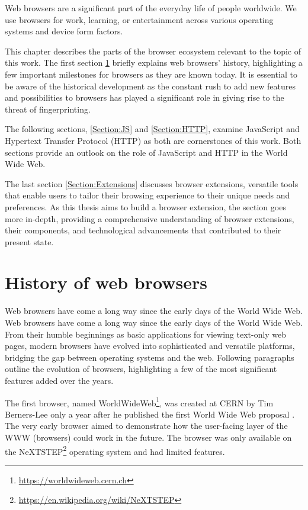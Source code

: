 Web browsers are a significant part of the everyday life of people worldwide. We use browsers for work, learning, or entertainment across various operating systems and device form factors.

This chapter describes the parts of the browser ecosystem relevant to the topic of this work. The first section \ref{Section:BrowsersHistory} briefly explains web browsers' history, highlighting a few important milestones for browsers as they are known today. It is essential to be aware of the historical development as the constant rush to add new features and possibilities to browsers has played a significant role in giving rise to the threat of fingerprinting.

The following sections, \ref{Section:JS} and \ref{Section:HTTP}, examine JavaScript and Hypertext Transfer Protocol (HTTP) as both are cornerstones of this work. Both sections provide an outlook on the role of JavaScript and HTTP in the World Wide Web.

The last section \ref{Section:Extensions} discusses browser extensions, versatile tools that enable users to tailor their browsing experience to their unique needs and preferences. As this thesis aims to build a browser extension, the section goes more in-depth, providing a comprehensive understanding of browser extensions, their components, and technological advancements that contributed to their present state.

\section{History of web browsers}
\label{Section:BrowsersHistory}

Web browsers have come a long way since the early days of the World Wide Web. Web browsers have come a long way since the early days of the World Wide Web. From their humble beginnings as basic applications for viewing text-only web pages, modern browsers have evolved into sophisticated and versatile platforms, bridging the gap between operating systems and the web. Following paragraphs outline the evolution of browsers, highlighting a few of the most significant features added over the years.

The first browser, named WorldWideWeb\footnote{\url{https://worldwideweb.cern.ch}}, was created at CERN by Tim Berners-Lee only a year after he published the first World Wide Web proposal \cite{WWWProposal}. The very early browser aimed to demonstrate how the user-facing layer of the WWW (browsers) could work in the future. The browser was only available on the NeXTSTEP\footnote{\url{https://en.wikipedia.org/wiki/NeXTSTEP}} operating system and had limited features.

